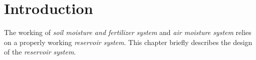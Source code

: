 \documentclass[../../main]{subfiles}
\begin{document}
\section{Introduction} \label{sec:}

The working of \emph{soil moisture and fertilizer system} and \emph{air moisture system}
relies on a properly working \emph{reservoir system}. This chapter briefly describes the
design of the \emph{reservoir system}.
\end{document}
